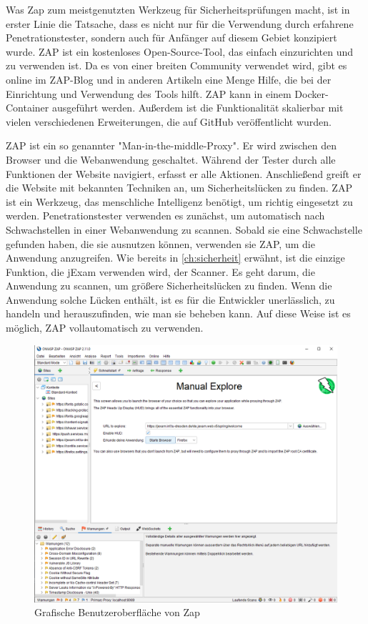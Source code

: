 Was Zap zum meistgenutzten Werkzeug für Sicherheitsprüfungen macht,
ist in erster Linie die Tatsache, dass es nicht nur für die Verwendung
durch erfahrene Penetrationstester, sondern auch für Anfänger auf diesem
Gebiet konzipiert wurde. ZAP ist ein kostenloses Open-Source-Tool, das
einfach einzurichten und zu verwenden ist. Da es von einer breiten Community
verwendet wird, gibt es online im ZAP-Blog und in anderen Artikeln eine Menge
Hilfe, die bei der Einrichtung und Verwendung des Tools hilft.
ZAP kann in einem Docker-Container ausgeführt werden. Außerdem ist die
Funktionalität skalierbar mit vielen verschiedenen Erweiterungen, die
auf GitHub veröffentlicht wurden.


ZAP ist ein so genannter "Man-in-the-middle-Proxy". Er wird zwischen den
Browser und die Webanwendung geschaltet. Während der Tester durch alle
Funktionen der Website navigiert, erfasst er alle Aktionen. Anschließend
greift er die Website mit bekannten Techniken an, um Sicherheitslücken zu
finden.  ZAP ist ein Werkzeug, das menschliche Intelligenz benötigt,
um richtig eingesetzt zu werden.
Penetrationstester verwenden es zunächst, um automatisch nach Schwachstellen
in einer Webanwendung zu scannen. Sobald sie eine Schwachstelle gefunden
haben, die sie ausnutzen können, verwenden sie ZAP, um die Anwendung
anzugreifen. Wie bereits in \autoref{ch:sicherheit} erwähnt, ist die einzige Funktion,
die jExam verwenden wird, der Scanner. Es geht darum, die Anwendung zu
scannen, um größere Sicherheitslücken zu finden.  Wenn die Anwendung solche
Lücken enthält, ist es für die Entwickler unerlässlich, zu handeln und
herauszufinden, wie man sie beheben kann. Auf diese Weise ist es möglich,
ZAP vollautomatisch zu verwenden.


\begin{figure}[H]
    \centering
    \includegraphics[scale=0.5]{images/zap-interface}
    \caption{Grafische Benutzeroberfläche von Zap} \label{fig:zap-interface}
\end{figure}


